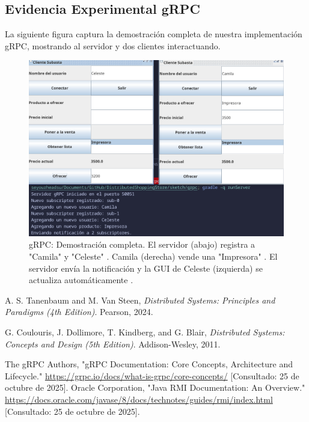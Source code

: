 \documentclass[11pt, a4paper]{article}
\begin{document}
\subsection{Evidencia Experimental gRPC}
La siguiente figura captura la demostración completa de nuestra implementación gRPC, mostrando al servidor y dos clientes interactuando.
\begin{figure}[h!]
    \centering
    \includegraphics[width=1.0\linewidth]{media/grpc-screenshots/Two-Clients+Server-Output.png}
    \caption{gRPC: Demostración completa. El servidor (abajo) registra a "Camila" y "Celeste" . Camila (derecha) vende una "Impresora" . El servidor envía la notificación y la GUI de Celeste (izquierda) se actualiza automáticamente .}
    \label{fig:grpc_full}
\end{figure}


\newpage

\begin{thebibliography}{9}

A. S. Tanenbaum and M. Van Steen,
\textit{Distributed Systems: 
Principles and Paradigms (4th Edition)}.
Pearson, 2024.

G. Coulouris, J. Dollimore, T. Kindberg, and G. Blair,
\textit{Distributed Systems: Concepts and Design (5th Edition)}.
Addison-Wesley, 2011.

The gRPC Authors, "gRPC Documentation: Core Concepts, Architecture and Lifecycle."
\url{https://grpc.io/docs/what-is-grpc/core-concepts/}
[Consultado: 25 de octubre de 2025].
Oracle Corporation, "Java RMI Documentation: An Overview."
\url{https://docs.oracle.com/javase/8/docs/technotes/guides/rmi/index.html}
[Consultado: 25 de octubre de 2025].

\end{thebibliography}
\end{document}
